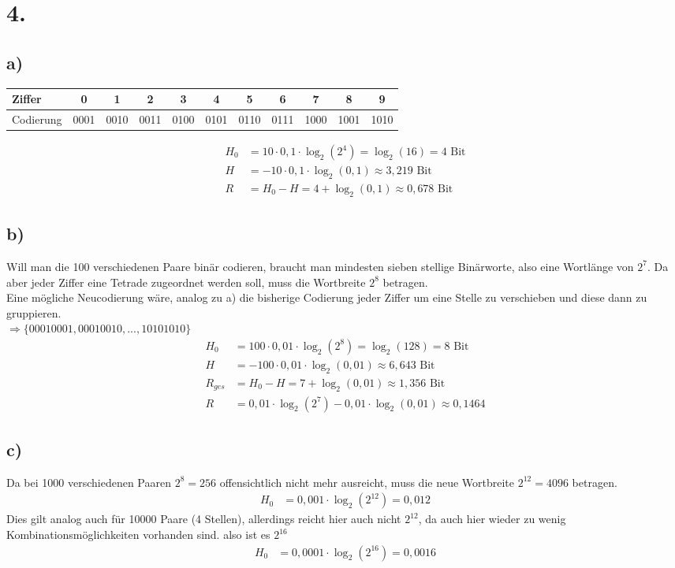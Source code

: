 \documentclass[a4paper]{scrartcl}
\begin{document}
	
\section{4.}	
	\subsection{a)}
		\begin{tabular}{l|c|c|c|c|c|c|c|c|c|c}
		Ziffer& 0&1&2&3&4&5&6&7&8&9\\ \hline
		Codierung&0001&0010&0011&0100&0101&0110&0111&1000&1001&1010
		\end{tabular}
		\begin{align}
			H_0&=10\cdot 0,1\cdot \log_2(2^4) = \log_2(16)=4\text{ Bit} \\
			H &= -10\cdot 0,1\cdot \log_2(0,1) \approx 3,219\text{ Bit} \\
			R &= H_0-H = 4+\log_2(0,1) \approx 0,678 \text{ Bit} 
		\end{align}
		
	\subsection{b)}
		Will man die 100 verschiedenen Paare binär codieren, braucht man mindesten sieben stellige 
		Binärworte, also eine Wortlänge von \(2^7\). Da aber jeder Ziffer eine Tetrade zugeordnet 
		werden soll, muss die Wortbreite \(2^8\) betragen. \\
		Eine mögliche Neucodierung wäre, analog zu a) die bisherige Codierung jeder Ziffer um eine 
		Stelle zu verschieben und diese dann zu gruppieren. \\
		\(\Rightarrow \Big\{00010001,00010010,...,10101010\Big\}\)
		\begin{align}
			H_0&=100\cdot 0,01\cdot \log_2(2^8) = \log_2(128)=8\text{ Bit} \\
			H &= -100\cdot 0,01\cdot \log_2(0,01) \approx 6,643\text{ Bit} \\
			R_{ges} &= H_0-H = 7+\log_2(0,01) \approx 1,356 \text{ Bit} \\ 
			R &= 0,01\cdot \log_2(2^7)- 0,01\cdot \log_2(0,01) \approx 0,1464
		\end{align}
		
	\subsection{c)}
		Da bei 1000 verschiedenen Paaren \(2^8=256\) offensichtlich nicht mehr ausreicht, muss die 
		neue Wortbreite \(2^{12} = 4096\) betragen. \\
		\begin{align}
			H_0&= 0,001\cdot\log_2(2^{12}) = 0,012
		\end{align}
		Dies gilt analog auch für 10000 Paare (4 Stellen), allerdings reicht hier auch nicht 
		\(2^{12}\), da auch hier wieder zu wenig Kombinationsmöglichkeiten vorhanden sind.
		also ist es \(2^{16}\) 
		\begin{align}
			H_0&= 0,0001\cdot\log_2(2^{16}) = 0,0016 
		\end{align}
			
\end{document}
